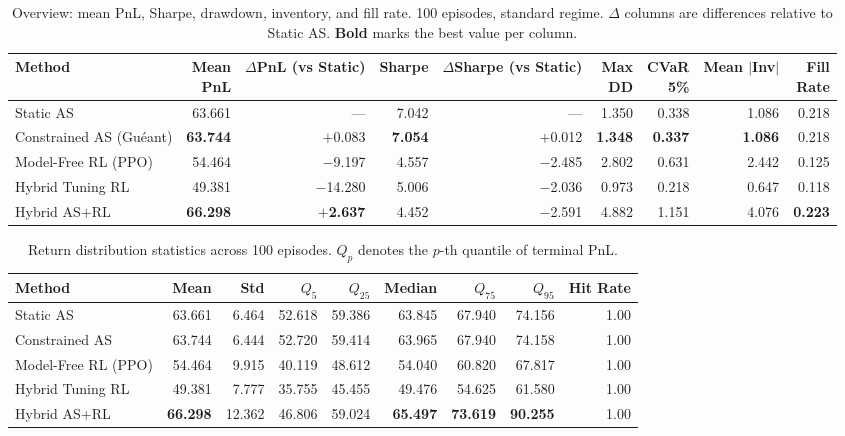 \documentclass[11pt]{article}
\newcommand{\PnL}{\mathrm{PnL}}
\begin{document}
\begin{table}[H]
\centering
\caption{Overview: mean PnL, Sharpe, drawdown, inventory, and fill rate.
  100 episodes, standard regime.
  $\Delta$ columns are differences relative to Static AS.
  \textbf{Bold} marks the best value per column.}
\label{tab:main_results}
\small
\setlength{\tabcolsep}{4.5pt}
\begin{tabular}{@{}lrrrrrrrr@{}}
\toprule
Method
  & \makecell{Mean\\PnL} & \makecell{$\Delta$PnL\\(vs Static)}
  & Sharpe & \makecell{$\Delta$Sharpe\\(vs Static)}
  & \makecell{Max\\DD} & \makecell{CVaR\\5\%}
  & \makecell{Mean\\$|$Inv$|$} & \makecell{Fill\\Rate} \\
\midrule
Static AS
  & 63.661 & ---
  & 7.042 & ---
  & 1.350 & 0.338
  & 1.086 & 0.218 \\
Constrained AS (Gu\'{e}ant)
  & \textbf{63.744} & $+$0.083
  & \textbf{7.054} & $+$0.012
  & \textbf{1.348} & \textbf{0.337}
  & \textbf{1.086} & 0.218 \\
Model-Free RL (PPO)
  & 54.464 & $-$9.197
  & 4.557 & $-$2.485
  & 2.802 & 0.631
  & 2.442 & 0.125 \\
Hybrid Tuning RL
  & 49.381 & $-$14.280
  & 5.006 & $-$2.036
  & 0.973 & 0.218
  & 0.647 & 0.118 \\
Hybrid AS+RL
  & \textbf{66.298} & $+$\textbf{2.637}
  & 4.452 & $-$2.591
  & 4.882 & 1.151
  & 4.076 & \textbf{0.223} \\
\bottomrule
\end{tabular}
\end{table}

\begin{table}[H]
\centering
\caption{Return distribution statistics across 100 episodes.
  $Q_p$ denotes the $p$-th quantile of terminal PnL.}
\label{tab:return_results}
\small
\setlength{\tabcolsep}{4pt}
\begin{tabular}{@{}lrrrrrrrr@{}}
\toprule
Method
  & Mean & Std & $Q_5$ & $Q_{25}$ & Median & $Q_{75}$ & $Q_{95}$
  & Hit Rate \\
\midrule
Static AS
  & 63.661 & 6.464 & 52.618 & 59.386 & 63.845 & 67.940 & 74.156 & 1.00 \\
Constrained AS
  & 63.744 & 6.444 & 52.720 & 59.414 & 63.965 & 67.940 & 74.158 & 1.00 \\
Model-Free RL (PPO)
  & 54.464 & 9.915 & 40.119 & 48.612 & 54.040 & 60.820 & 67.817 & 1.00 \\
Hybrid Tuning RL
  & 49.381 & 7.777 & 35.755 & 45.455 & 49.476 & 54.625 & 61.580 & 1.00 \\
Hybrid AS+RL
  & \textbf{66.298} & 12.362 & 46.806 & 59.024 & \textbf{65.497}
  & \textbf{73.619} & \textbf{90.255} & 1.00 \\
\bottomrule
\end{tabular}
\end{table}
\end{document}
